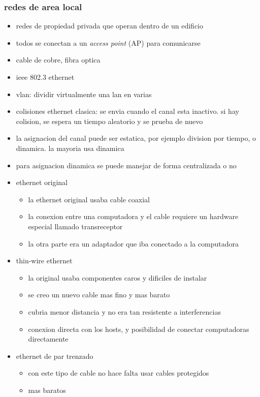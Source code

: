 \documentclass[11pt]{article}
\begin{document}
\subsubsection{redes de area local}
\label{sec:org08002cc}
\begin{itemize}
\item redes de propiedad privada que operan dentro de un edificio
\item todos se conectan a un \emph{access point} (AP) para comunicarse
\item cable de cobre, fibra optica
\item ieee 802.3 ethernet
\item vlan: dividir virtualmente una lan en varias
\item colisiones ethernet clasica: se envia cuando el canal esta inactivo. si hay colision, se espera un tiempo aleatorio y se prueba de nuevo
\item la asignacion del canal puede ser estatica, por ejemplo division por tiempo, o dinamica. la mayoria usa dinamica
\item para asignacion dinamica se puede manejar de forma centralizada o no
\item ethernet original
\begin{itemize}
\item la ethernet original usaba cable coaxial
\item la conexion entre una computadora y el cable requiere un hardware especial llamado transreceptor
\item la otra parte era un adaptador que iba conectado a la computadora
\end{itemize}
\item thin-wire ethernet
\begin{itemize}
\item la original usaba componentes caros y dificiles de instalar
\item se creo un nuevo cable mas fino y mas barato
\item cubria menor distancia y no era tan resistente a interferencias
\item conexion directa con los hosts, y posibilidad de conectar computadoras directamente
\end{itemize}
\item ethernet de par trenzado
\begin{itemize}
\item con este tipo de cable no hace falta usar cables protegidos
\item mas baratos

\end{itemize}
\end{itemize}
\end{document}
